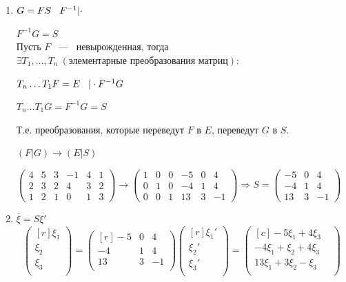 \begin{enumerate}
	\item 
	
	$G=FS \hspace{3mm} F^{-1}|\cdot$
	
	$F^{-1}G = S$\\
	Пусть $F$ ~---~ невырожденная, тогда $\exists T_1,\dots,T_n\ (\text{элементарные преобразования матриц})$:
	
	$T_n\dots T_1F=E \hspace{3mm} |\cdot F^{-1}G$
	
	$T_n\dots T_1G=F^{-1}G=S$
	\vspace{2mm}
	
	Т.е. преобразования, которые переведут $F$ в $E$, переведут $G$ в $S$.
	
	$(F|G) \rightarrow (E|S)$
	
	$\left( \begin{array}{ccc|ccc}
	4 & 5 & 3 & -1 &4 & 1  \\
	2 & 3& 2&4&3&2\\
	1&2&1&0&1&3
	\end{array}\right)\rightarrow \left( \begin{array}{ccc|ccc}
	1  & 0 & 0 & -5 &0 & 4  \\
	0 & 1& 0&-4&1&4\\
	0&0&1&13&3&-1
	\end{array}\right)
	\Rightarrow S=\left( \begin{array}{ccc}
	-5 &0 & 4  \\
	-4&1&4\\
	13&3&-1
	\end{array}\right)
	$
	\item $\overline{\xi}=S\overline{\xi'}$
	$$\begin{pmatrix*}[r]
	\xi_1\\  
	\xi_2\\
	\xi_3\\
	\end{pmatrix*} = \begin{pmatrix*}[r]
	-5 & 0 & 4\\
	-4 & 1 & 4\\
	13 & 3 & -1\\
	\end{pmatrix*}\begin{pmatrix*}[r]
	\xi_1'\\  
	\xi_2'\\
	\xi_3'\\
	\end{pmatrix*} =\begin{pmatrix*}[c]
	-5\xi_1+4\xi_3 & \\  
	-4\xi_1+\xi_2+4\xi_3 & \\
	13\xi_1 +3\xi_2 -\xi_3 & \\
	\end{pmatrix*}
	$$
	
\end{enumerate}
